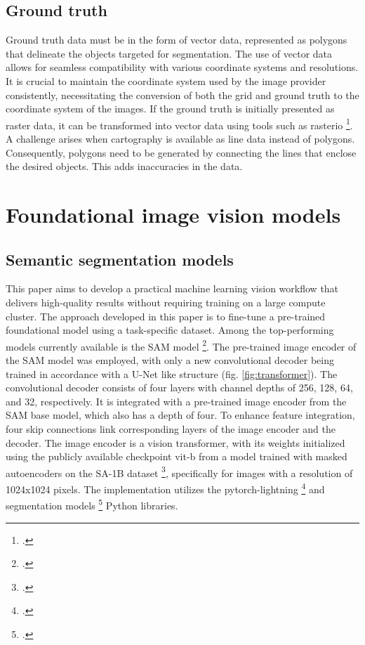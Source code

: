 \begin{refsection}
\subsection{Ground truth}

Ground truth data must be in the form of vector data, represented as polygons that delineate the objects targeted for segmentation. The use of vector data allows for seamless compatibility with various coordinate systems and resolutions. It is crucial to maintain the coordinate system used by the image provider consistently, necessitating the conversion of both the grid and ground truth to the coordinate system of the images. If the ground truth is initially presented as raster data, it can be transformed into vector data using tools such as rasterio \footcite{gillies_rasterio_2013}. \\


A challenge arises when cartography is available as line data instead of polygons. 
Consequently, polygons need to be generated by connecting the lines that enclose 
the desired objects. This adds inaccuracies in the data. 

\renewcommand{\sectionnametext}{Foundational image vision models}
\renewcommand{\headingtextR}{\thesection. \sectionnametext}
\section{\sectionnametext}

\subsection{Semantic segmentation models}
This paper aims to develop a practical machine learning vision workflow that delivers high-quality results without requiring training on a large compute cluster. The approach developed in this paper is to fine-tune a pre-trained foundational model using a task-specific dataset. Among the top-performing models currently available is the SAM model \footcite{kirillov_segment_2023}.
The pre-trained image encoder of the SAM model 
was employed, with only a new convolutional decoder being trained in
accordance with a U-Net like structure (fig. \ref{fig:transformer}). The convolutional decoder consists of four layers with channel depths of 256, 128, 64, and 32, respectively. It is integrated with a pre-trained image encoder from the SAM base model, which also has a depth of four. To enhance feature integration, four skip connections link corresponding layers of the image encoder and the decoder. The image encoder is a vision transformer, with its weights initialized using the publicly available checkpoint vit-b from a model trained with masked autoencoders on the SA-1B dataset \footcite{he_masked_2022, kirillov_segment_2023}, specifically for images with a resolution of 1024x1024 pixels. 
The implementation utilizes the pytorch-lightning \footcite{falcon_pytorch_2023}
and segmentation models \footcite{iakubovskii_segmentation_models_pytorch_2019}
Python libraries. \\


\end{refsection}
